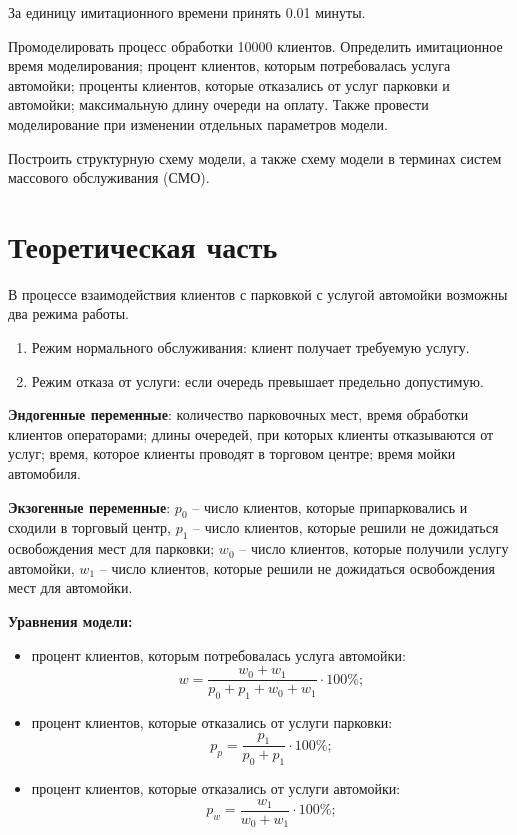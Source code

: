 \documentclass[14pt, a4paper]{extarticle}
\begin{document}
За единицу имитационного времени принять 0.01 минуты.

Промоделировать процесс обработки 10000 клиентов. Определить имитационное время моделирования; процент клиентов, которым потребовалась услуга автомойки; проценты клиентов, которые отказались от услуг парковки и автомойки; максимальную длину очереди на оплату. Также провести моделирование при изменении отдельных параметров модели.

Построить структурную схему модели, а также схему модели в терминах систем массового обслуживания (СМО).




\section{Теоретическая часть}


В процессе взаимодействия клиентов с парковкой с услугой автомойки возможны два режима работы.
\begin{enumerate}
	\item Режим нормального обслуживания: клиент получает требуемую услугу.
	\item Режим отказа от услуги: если очередь превышает предельно допустимую.
\end{enumerate}


\textbf{Эндогенные переменные}: количество парковочных мест, время обработки клиентов операторами; длины очередей, при которых клиенты отказываются от услуг; время, которое клиенты проводят в торговом центре; время мойки автомобиля.

\textbf{Экзогенные переменные}: $p_0$ -- число клиентов, которые припарковались и сходили в торговый центр, $p_1$ -- число  клиентов, которые решили не дожидаться освобождения мест для парковки; $w_0$ -- число клиентов, которые получили услугу автомойки, $w_1$ -- число  клиентов, которые решили не дожидаться освобождения мест для автомойки.

\textbf{Уравнения модели:} 
\begin{itemize}
	\item процент клиентов, которым потребовалась услуга автомойки:
	\begin{equation}
		w = \frac{w_0 + w_1}{p_0 + p_1 + w_0 + w_1} \cdot 100\%;
	\end{equation}

	\item процент клиентов, которые отказались от услуги парковки:
\begin{equation}
	p_{\textit{p}} = \frac{p_1}{p_0 + p_1} \cdot 100\%;
\end{equation}

	\item процент клиентов, которые отказались от услуги автомойки:
\begin{equation}
	p_{\textit{w}} = \frac{w_1}{w_0 + w_1} \cdot 100\%;
\end{equation}
\end{itemize}
\end{document}
